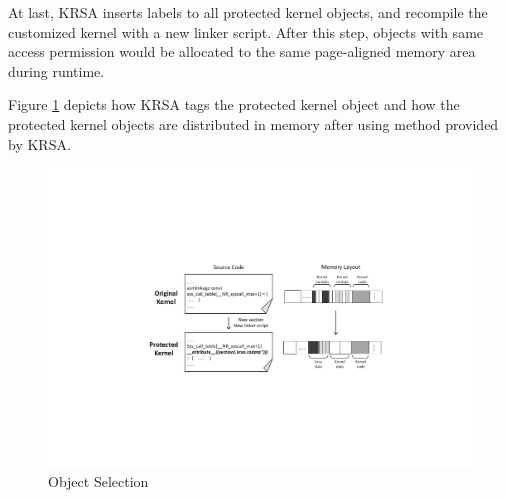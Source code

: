 \documentclass[conference]{IEEEtran}
\begin{document}
At last, KRSA inserts labels to all protected kernel objects, and recompile the customized kernel with a new linker script. After this step, objects with same access permission would be allocated to the same page-aligned memory area during runtime.

Figure \ref{recompile} depicts how KRSA tags the protected kernel object and how the protected kernel objects are distributed in memory after using method provided by KRSA. 

\begin{figure}
    \centering
    \includegraphics[scale=0.5]{pic/data_aggregate.pdf}
    \caption{Object Selection}
    \label{recompile}
\end{figure}
\end{document}
